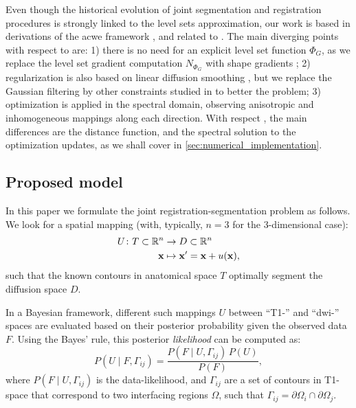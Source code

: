 Even though the historical evolution
of joint segmentation and registration procedures is strongly linked
to the level sets approximation, our work is based in derivations of
the \gls{acwe} framework \citep{chan_active_2001}, and related to
\citep{le_guyader_combined_2011}.
{\color{red} {The main diverging points with respect to
\citep{gorthi_active_2011} are: 1) there is no need for an explicit level set function
$\Phi_G$, as we replace the level set gradient computation $N_{\Phi_G}$ with shape
gradients \citep{jehan-besson_dream2s:_2003,herbulot_segmentation_2006};
2) regularization is also based on linear diffusion smoothing \citep{thirion_image_1998},
but we replace the Gaussian filtering by other constraints
studied in \citep{nagel_investigation_1986} to better the problem;
3) optimization is applied in the spectral
domain, observing anisotropic and inhomogeneous mappings along each direction.
With respect \citep{le_guyader_combined_2011}, the main differences are
the distance function, and the spectral solution to the optimization updates,
as we shall cover in \autoref{sec:numerical_implementation}.}}



\subsection{Proposed model}
\label{sec:methods_map}
In this paper we formulate the joint registration-segmentation
problem as follows. We look for a spatial mapping (with, typically,
$n=3$ for the 3-dimensional case):
\begin{align}
U\colon T \subset \mathbb{R}^n &\to D \subset \mathbb{R}^n \notag\\
\mathbf{x} &\mapsto \mathbf{x}' =\mathbf{x}+u(\mathbf{x}),
\label{eq:deformation_field}
\end{align}
such that the known contours in anatomical space $T$ optimally segment
the diffusion space $D$.

In a Bayesian framework, different such mappings $U$ between ``T1-''
and ``\gls*{dwi}-'' spaces are evaluated based on their posterior
probability given the observed data $F$. Using the Bayes' rule, this
posterior \emph{likelihood} can be computed as:
\begin{equation}
P(U \mid F,\Gamma_{ij}) = \frac{P(F \mid U,\Gamma_{ij})\, P(U)}{P(F)},
\label{eq:bayes_rule}
\end{equation}
where $P(F \mid U,\Gamma_{ij})$ is the data-likelihood, and
$\Gamma_{ij}$ are a set of contours in T1-space that correspond to
two interfacing regions $\Omega$, such that 
$\Gamma_{ij} = \partial \Omega_i \cap \partial \Omega_j$.

